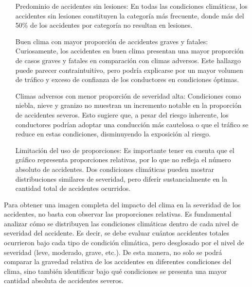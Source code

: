 \documentclass{book}
\begin{document}
\begin{enumerate}[align=left, leftmargin=*, labelwidth=0pt, labelsep=0pt, font=\bfseries]

\item[Predominio de accidentes sin lesiones:] En todas las condiciones climáticas, los accidentes sin lesiones constituyen la categoría más frecuente, donde más del 50\% de los accidentes por categoría no resultan en lesiones.

\item[Buen clima con mayor proporción de accidentes graves y fatales:] Curiosamente, los accidentes en buen clima presentan una mayor proporción de casos graves y fatales en comparación con climas adversos. Este hallazgo puede parecer contraintuitivo, pero podría explicarse por un mayor volumen de tráfico y exceso de confianza de los conductores en condiciones óptimas.

\item[Climas adversos con menor proporción de severidad alta:] Condiciones como niebla, nieve y granizo no muestran un incremento notable en la proporción de accidentes severos. Esto sugiere que, a pesar del riesgo inherente, los conductores podrían adoptar una conducción más cautelosa o que el tráfico se reduce en estas condiciones, disminuyendo la exposición al riesgo.

\item[Limitación del uso de proporciones:] Es importante tener en cuenta que el gráfico representa proporciones relativas, por lo que no refleja el número absoluto de accidentes. Dos condiciones climáticas pueden mostrar distribuciones similares de severidad, pero diferir sustancialmente en la cantidad total de accidentes ocurridos.

\end{enumerate}

Para obtener una imagen completa del impacto del clima en la severidad de los accidentes, no basta con observar las proporciones relativas. Es fundamental analizar cómo se distribuyen las condiciones climáticas dentro de cada nivel de severidad del accidente. Es decir, se debe evaluar cuántos accidentes totales ocurrieron bajo cada tipo de condición climática, pero desglosado por el nivel de severidad (leve, moderado, grave, etc.). De esta manera, no solo se podrá comparar la gravedad relativa de los accidentes en diferentes condiciones del clima, sino también identificar bajo qué condiciones se presenta una mayor cantidad absoluta de accidentes severos.
\end{document}
